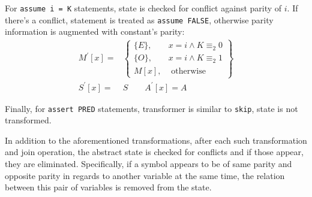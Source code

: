 For \texttt{assume i = K} statements, state is checked for conflict against parity of $i$. If there's a conflict, statement is treated as  \texttt{assume FALSE}, otherwise parity information is augmented with constant's parity:
\begin{align*}
M^\prime[x] = & \left.
	\begin{cases}
		\{E\}, & x = i \wedge K \equiv_{2} 0 \\
		\{O\}, & x = i \wedge K \equiv_{2} 1 \\
		M[x], & \text{ otherwise}
	\end{cases}
\right\}\\
S^\prime[x] = & S \qquad
A^\prime[x] =  A
\end{align*}


Finally, for \texttt{assert PRED} statements, transformer is similar to \texttt{skip}, state is not transformed.

In addition to the aforementioned transformations, after each such transformation and join operation, the abstract state is checked for conflicts and if those appear, they are eliminated. Specifically, if a symbol appears to be of same parity and opposite parity in regards to another variable at the same time, the relation between this pair of variables is removed from the state.
